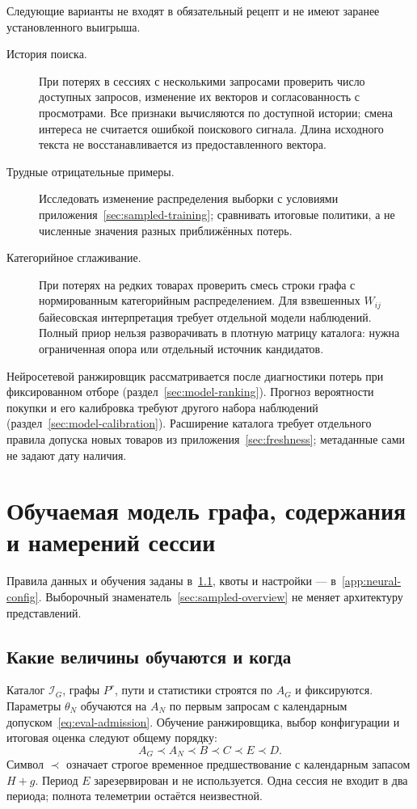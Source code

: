 \documentclass[12pt,a4paper]{article}
\theoremstyle{plainru}
\begin{document}
Следующие варианты не входят в обязательный рецепт и не имеют
заранее установленного выигрыша.
\begin{description}
\item[История поиска.]
При потерях в сессиях с несколькими запросами проверить число
доступных запросов, изменение их векторов и согласованность с просмотрами.
Все признаки вычисляются по доступной истории; смена интереса
не считается ошибкой поискового сигнала. Длина исходного текста
не восстанавливается из предоставленного вектора.
\item[Трудные отрицательные примеры.]
Исследовать изменение распределения выборки с условиями
приложения~\ref{sec:sampled-training}; сравнивать итоговые политики,
а не численные значения разных приближённых потерь.
\item[Категорийное сглаживание.]
При потерях на редких товарах проверить смесь строки графа
с нормированным категорийным распределением. Для взвешенных $W_{ij}$
байесовская интерпретация требует отдельной модели наблюдений.
Полный приор нельзя разворачивать в плотную матрицу каталога:
нужна ограниченная опора или отдельный источник кандидатов.
\end{description}

Нейросетевой ранжировщик рассматривается после диагностики потерь
при фиксированном отборе (раздел~\ref{sec:model-ranking}).
Прогноз вероятности покупки и его калибровка требуют другого набора
наблюдений (раздел~\ref{sec:model-calibration}).
Расширение каталога требует отдельного правила допуска новых товаров
из приложения~\ref{sec:freshness}; метаданные сами не задают дату наличия.

\section{Обучаемая модель графа, содержания и намерений сессии}
\label{sec:modern-model}

Правила данных и обучения заданы в~\ref{sec:modern-time}, квоты
и настройки --- в~\ref{app:neural-config}.
Выборочный знаменатель~\ref{sec:sampled-overview}
не меняет архитектуру представлений.

\subsection{Какие величины обучаются и когда}
\label{sec:modern-time}

Каталог $\mathcal I_G$, графы $P^r$, пути и статистики строятся по $A_G$
и фиксируются. Параметры $\theta_N$ обучаются на $A_N$ по первым запросам
с календарным допуском~\eqref{eq:eval-admission}. Обучение ранжировщика,
выбор конфигурации и итоговая оценка следуют общему порядку:
\begin{equation}\label{eq:modern-periods}
A_G\prec A_N\prec B\prec C\prec E\prec D.
\end{equation}
Символ $\prec$ означает строгое временное предшествование с календарным
запасом $H+g$. Период $E$ зарезервирован и не используется.
Одна сессия не входит в два периода; полнота телеметрии остаётся неизвестной.
\end{document}
